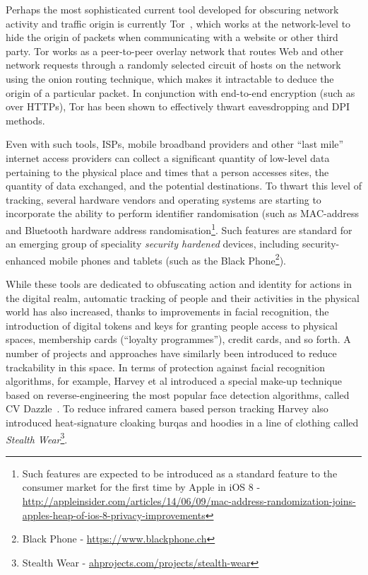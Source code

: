 \documentclass{IOS-Book-Article}     %
\begin{document}
Perhaps the most sophisticated current tool developed for obscuring network
activity and traffic origin is currently Tor~\cite{dingledine2004tor}, which
works at the network-level to hide the origin of packets when communicating with
a website or other third party.  Tor works as a peer-to-peer overlay network
that routes Web and other network requests through a randomly selected circuit
of hosts on the network using the onion routing technique, which makes it
intractable to deduce the origin of a particular packet.  In conjunction with
end-to-end encryption (such as over HTTPs), Tor has been shown to effectively
thwart eavesdropping and DPI methods.

Even with such tools, ISPs, mobile broadband providers and other ``last mile''
internet access providers can collect a significant quantity of low-level data
pertaining to the physical place and times that a person accesses sites, the
quantity of data exchanged, and the potential destinations.  To thwart this
level of tracking, several hardware vendors and operating systems are starting
to incorporate the ability to perform identifier randomisation (such as
MAC-address and Bluetooth hardware address randomisation\footnote{Such features
are expected to be introduced as a standard feature to the consumer market for
the first time by Apple in iOS 8 -
\url{http://appleinsider.com/articles/14/06/09/mac-address-randomization-joins-apples-heap-of-ios-8-privacy-improvements}}.
 Such features are standard for an emerging group of speciality \emph{security
hardened} devices, including security-enhanced mobile phones and tablets (such
as the Black Phone\footnote{Black Phone - \url{https://www.blackphone.ch}}).

While these tools are dedicated to obfuscating action and identity for actions
in the digital realm, automatic tracking of people and their activities in the
physical world has also increased, thanks to improvements in facial recognition,
the introduction of digital tokens and keys for granting people access to
physical spaces, membership cards (``loyalty programmes''), credit cards, and so
forth.  A number of projects and approaches have similarly been introduced to
reduce trackability in this space.  In terms of protection against facial
recognition algorithms, for example, Harvey et al introduced a special make-up
technique based on reverse-engineering the most popular face detection
algorithms, called CV Dazzle~\cite{harvey2012cv}. To reduce infrared camera
based person tracking Harvey also introduced heat-signature cloaking burqas and
hoodies in a line of clothing called \emph{Stealth Wear}\footnote{Stealth Wear -
\url{ahprojects.com/projects/stealth-wear}}.
\end{document}
